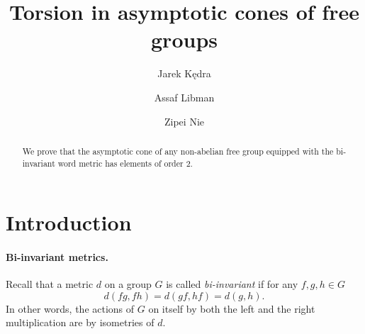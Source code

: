 \documentclass[12pt,reqno,a4paper]{article}
\theoremstyle{definition}
\theoremstyle{remark}
\numberwithin{equation}{section}
\numberwithin{figure}{section}
\newcommand{\AL}[1]{\textcolor{red}{#1}}
\begin{document}
\title{Torsion in asymptotic cones of free groups}
\author{Jarek K\k{e}dra}
\author{Assaf Libman}
\author{Zipei Nie}







\maketitle

\begin{abstract}
We prove that the asymptotic cone of any non-abelian free group equipped with the bi-invariant word metric has elements of order $2$.
\end{abstract}



\section{Introduction}\label{S:intro}


\paragraph{Bi-invariant metrics.}
Recall that a metric $d$ on a group $G$ is called {\em bi-invariant} if for any $f,g,h\in G$
$$
d(fg,fh) = d(gf,hf) = d(g,h).
$$
In other words, the actions of $G$ on itself by both the left and the right multiplication are by isometries of $d$.
\end{document}
